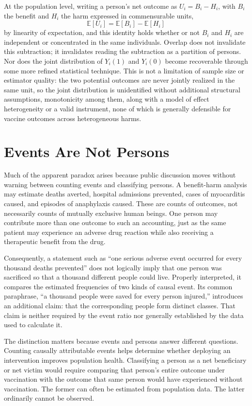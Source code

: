 \documentclass[11pt]{article}
\begin{document}
At the population level, writing a person's net outcome as $U_i = B_i - H_i$, with $B_i$ the benefit and $H_i$ the harm expressed in commensurable units,
\[
\mathbb{E}[U_i] = \mathbb{E}[B_i] - \mathbb{E}[H_i]
\]
by linearity of expectation, and this identity holds whether or not $B_i$ and $H_i$ are independent or concentrated in the same individuals. Overlap does not invalidate this subtraction; it invalidates reading the subtraction as a partition of persons. Nor does the joint distribution of $Y_i(1)$ and $Y_i(0)$ become recoverable through some more refined statistical technique. This is not a limitation of sample size or estimator quality: the two potential outcomes are never jointly realized in the same unit, so the joint distribution is unidentified without additional structural assumptions, monotonicity among them, along with a model of effect heterogeneity or a valid instrument, none of which is generally defensible for vaccine outcomes across heterogeneous harms.

\section{Events Are Not Persons}

Much of the apparent paradox arises because public discussion moves without warning between counting events and classifying persons. A benefit-harm analysis may estimate deaths averted, hospital admissions prevented, cases of myocarditis caused, and episodes of anaphylaxis caused. These are counts of outcomes, not necessarily counts of mutually exclusive human beings. One person may contribute more than one outcome to such an accounting, just as the same patient may experience an adverse drug reaction while also receiving a therapeutic benefit from the drug.

Consequently, a statement such as ``one serious adverse event occurred for every thousand deaths prevented'' does not logically imply that one person was sacrificed so that a thousand different people could live. Properly interpreted, it compares the estimated frequencies of two kinds of causal event. Its common paraphrase, ``a thousand people were saved for every person injured,'' introduces an additional claim: that the corresponding people form distinct classes. That claim is neither required by the event ratio nor generally established by the data used to calculate it.

The distinction matters because events and persons answer different questions. Counting causally attributable events helps determine whether deploying an intervention improves population health. Classifying a person as a net beneficiary or net victim would require comparing that person's entire outcome under vaccination with the outcome that same person would have experienced without vaccination. The former can often be estimated from population data. The latter ordinarily cannot be observed.
\end{document}
